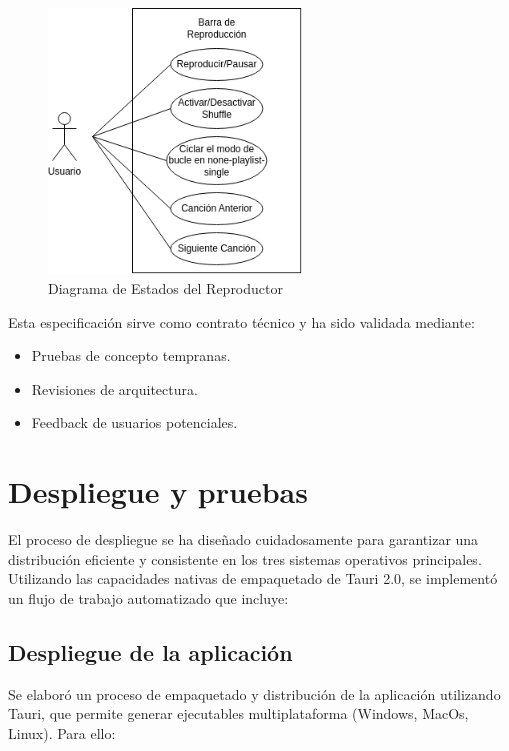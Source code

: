 \documentclass[11pt, a4paper]{article}
\begin{document}
  \begin{figure}[H]
    \centering
    \includegraphics[width=0.6\textwidth]{media/CasoUso2.drawio.png}
    \caption{Diagrama de Estados del Reproductor}
    \label{fig:state}
  \end{figure}

  Esta especificación sirve como contrato técnico y ha sido validada mediante:
  \begin{itemize}
    \item Pruebas de concepto tempranas.
    \item Revisiones de arquitectura.
    \item Feedback de usuarios potenciales.
  \end{itemize}

\section{Despliegue y pruebas}

El proceso de despliegue se ha diseñado cuidadosamente para garantizar una distribución eficiente y consistente en los tres sistemas operativos principales. Utilizando las capacidades nativas de empaquetado de Tauri 2.0, se implementó un flujo de trabajo automatizado que incluye:

        \subsection{Despliegue de la aplicación}

        Se elaboró un proceso de empaquetado y distribución de la aplicación utilizando Tauri, que permite generar ejecutables multiplataforma (Windows, MacOs, Linux). Para ello:
\end{document}
